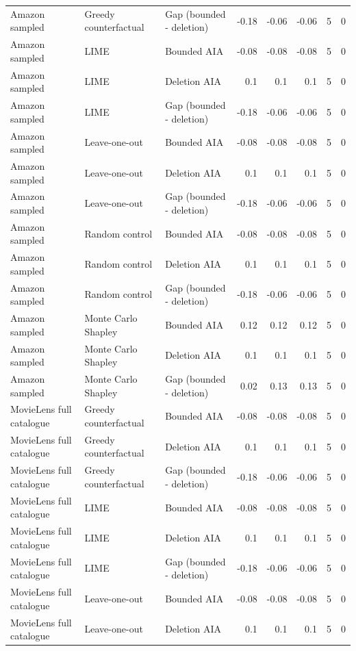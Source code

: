 \begin{table}[t]
{\begin{tabular}{lllrrrrr}
Amazon sampled & Greedy counterfactual & Gap (bounded - deletion) & -0.18 & -0.06 & -0.06 & 5 & 0 \\
Amazon sampled & LIME & Bounded AIA & -0.08 & -0.08 & -0.08 & 5 & 0 \\
Amazon sampled & LIME & Deletion AIA & 0.1 & 0.1 & 0.1 & 5 & 0 \\
Amazon sampled & LIME & Gap (bounded - deletion) & -0.18 & -0.06 & -0.06 & 5 & 0 \\
Amazon sampled & Leave-one-out & Bounded AIA & -0.08 & -0.08 & -0.08 & 5 & 0 \\
Amazon sampled & Leave-one-out & Deletion AIA & 0.1 & 0.1 & 0.1 & 5 & 0 \\
Amazon sampled & Leave-one-out & Gap (bounded - deletion) & -0.18 & -0.06 & -0.06 & 5 & 0 \\
Amazon sampled & Random control & Bounded AIA & -0.08 & -0.08 & -0.08 & 5 & 0 \\
Amazon sampled & Random control & Deletion AIA & 0.1 & 0.1 & 0.1 & 5 & 0 \\
Amazon sampled & Random control & Gap (bounded - deletion) & -0.18 & -0.06 & -0.06 & 5 & 0 \\
Amazon sampled & Monte Carlo Shapley & Bounded AIA & 0.12 & 0.12 & 0.12 & 5 & 0 \\
Amazon sampled & Monte Carlo Shapley & Deletion AIA & 0.1 & 0.1 & 0.1 & 5 & 0 \\
Amazon sampled & Monte Carlo Shapley & Gap (bounded - deletion) & 0.02 & 0.13 & 0.13 & 5 & 0 \\
MovieLens full catalogue & Greedy counterfactual & Bounded AIA & -0.08 & -0.08 & -0.08 & 5 & 0 \\
MovieLens full catalogue & Greedy counterfactual & Deletion AIA & 0.1 & 0.1 & 0.1 & 5 & 0 \\
MovieLens full catalogue & Greedy counterfactual & Gap (bounded - deletion) & -0.18 & -0.06 & -0.06 & 5 & 0 \\
MovieLens full catalogue & LIME & Bounded AIA & -0.08 & -0.08 & -0.08 & 5 & 0 \\
MovieLens full catalogue & LIME & Deletion AIA & 0.1 & 0.1 & 0.1 & 5 & 0 \\
MovieLens full catalogue & LIME & Gap (bounded - deletion) & -0.18 & -0.06 & -0.06 & 5 & 0 \\
MovieLens full catalogue & Leave-one-out & Bounded AIA & -0.08 & -0.08 & -0.08 & 5 & 0 \\
MovieLens full catalogue & Leave-one-out & Deletion AIA & 0.1 & 0.1 & 0.1 & 5 & 0 \\

\end{tabular}}
\end{table}
